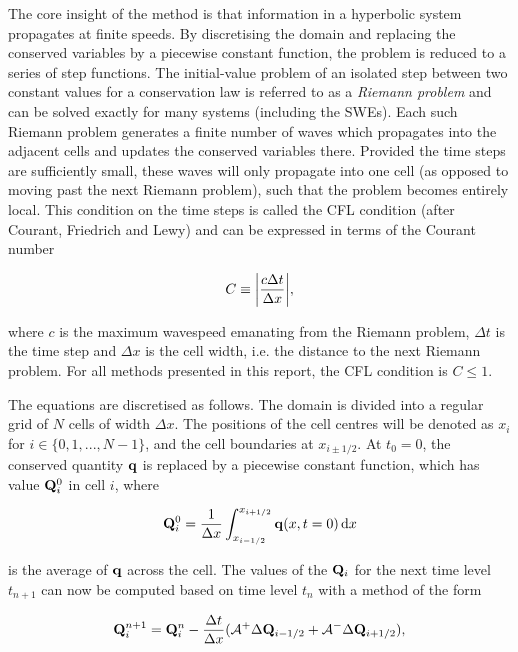 The core insight of the method is that information in a hyperbolic system propagates at finite speeds. By discretising the domain and replacing the conserved variables by a piecewise constant function, the problem is reduced to a series of step functions. The initial-value problem of an isolated step between two constant values for a conservation law is referred to as a \emph{Riemann problem} and can be solved exactly for many systems (including the SWEs). Each such Riemann problem generates a finite number of waves which propagates into the adjacent cells and updates the conserved variables there. Provided the time steps are sufficiently small, these waves will only propagate into one cell (as opposed to moving past the next Riemann problem), such that the problem becomes entirely local. This condition on the time steps is called the CFL condition (after Courant, Friedrich and Lewy) and can be expressed in terms of the Courant number

\begin{equation}
  C \equiv \qty|\frac{c \Delta t}{\Delta x}|,
\end{equation}

where $c$ is the maximum wavespeed emanating from the Riemann problem, $\Delta t$ is the time step and $\Delta x$ is the cell width, i.e. the distance to the next Riemann problem. For all methods presented in this report, the CFL condition is $C \leq 1$.

The equations are discretised as follows. The domain is divided into a regular grid of $N$ cells of width $\Delta x$. The positions of the cell centres will be denoted as $x_i$ for $i \in \{0, 1, ..., N-1\}$, and the cell boundaries at $x_{i \pm 1/2}$. At $t_0 = 0$, the conserved quantity $\vb q$ is replaced by a piecewise constant function, which has value $\vb Q_i^0$ in cell $i$, where

\begin{equation}
  \vb Q_i^0 = \frac{1}{\Delta x} \int_{x_{i-1/2}}^{x_{i+1/2}} \vb q(x, t=0)\,\dd x
\end{equation}

is the average of $\vb q$ across the cell. The values of the $\vb Q_i$ for the next time level $t_{n+1}$ can now be computed based on time level $t_n$ with a method of the form

\begin{equation}
\label{eq:wpf}
  \vb Q_i^{n+1} = \vb Q_i^n - \frac{\Delta t}{\Delta x} (\mathcal{A}^+ \Delta \vb Q_{i-1/2} + \mathcal{A}^- \Delta \vb Q_{i+1/2}),
\end{equation}

